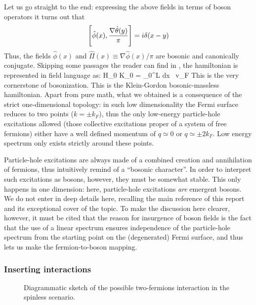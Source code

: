 Let us go straight to the end: expressing the above fields in terms of boson operators it turns out that
\[
	\comm{\hat \phi(x)}{\frac{\nabla \hat \theta(y)}{\pi}} = i \delta(x-y)
\]
Thus, the fields $\hat \phi(x)$ and $\hat \Pi(x) \equiv \nabla \hat \phi(x)/\pi$ are bosonic and canonically conjugate.
Skipping some passages the reader can find in \cite{giamarchi2003quantum}, the hamiltonian is represented in field language as:
\beq\label{eq:free-field-hamiltonian}
	\hat H_0 \simeq \hat K_0 =  \int_0^L dx \, v_F 
\eeq
This is the very cornerstone of bosonization. This is the Klein-Gordon bosonic-massless hamiltonian. Apart from pure math, what we obtained is a consequence of the strict one-dimensional topology: in such low dimensionality the Fermi surface reduces to two points ($k=\pm k_F$), thus the only low-energy particle-hole excitations allowed (those collective excitations proper of a system of free fermions) either have a well defined momentum of $q \simeq 0$ or $q \simeq \pm 2k_F$. Low energy spectrum only exists strictly around these points.

Particle-hole excitations are always made of a combined creation and annihilation of fermions, thus intuitively remind of a ``bosonic character''. In order to interpret such excitations as bosons, however, they must be somewhat stable. This only happens in one dimension: here, particle-hole excitations \textit{are} emergent bosons. We do not enter in deep details here, recalling the main reference of this report \cite{giamarchi2003quantum} and its exceptional cover of the topic. To make the discussion here clearer, however, it must be cited that the reason for insurgence of boson fields is the fact that the use of a linear spectrum ensures independence of the particle-hole spectrum from the starting point on the (degenerated) Fermi surface, and thus lets us make the fermion-to-boson mapping.

\subsubsection{Inserting interactions}

\begin{figure}
	\centering
	\subfloat[][$g_1 = V(q \approx \pm 2k_F)$ process.]{
		
		\label{fig:g1-process}
	}
	\subfloat[][$g_2 = V(q \approx 0)$ process.]{
		
		\label{fig:g2-process}
	}
	\subfloat[][$g_4 = V(q \approx 0)$ process.]{
		
		\label{fig:g4-process}
	}
	\label{fig:g-processes}
	\caption{Diagrammatic sketch of the possible two-fermions interaction in the spinless scenario.}
\end{figure}

